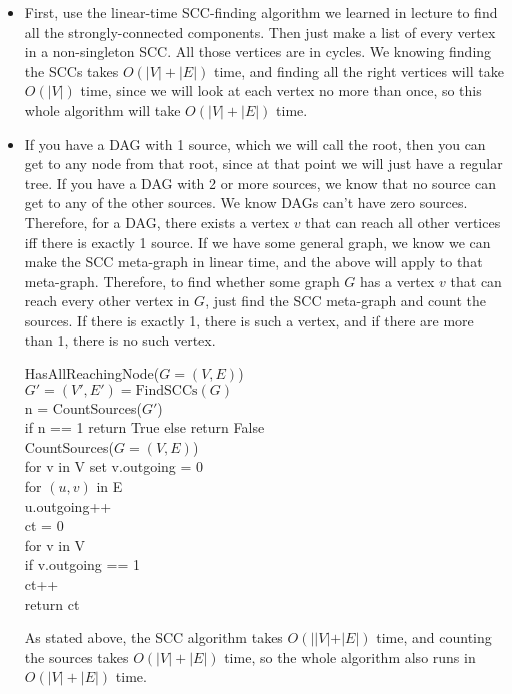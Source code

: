 \documentclass[11pt]{article}
\begin{document}
\begin{solution}
    \begin{itemize}
        \item First, use the linear-time SCC-finding algorithm we learned in lecture to find all the strongly-connected components. Then just make a list of every vertex in a non-singleton SCC. All those vertices are in cycles. We knowing finding the SCCs takes $O(|V| + |E|)$ time, and finding all the right vertices will take $O(|V|)$ time, since we will look at each vertex no more than once, so this whole algorithm will take $O(|V| + |E|)$ time. 
        \item If you have a DAG with 1 source, which we will call the root, then you can get to any node from that root, since at that point we will just have a regular tree. If you have a DAG with 2 or more sources, we know that no source can get to any of the other sources. We know DAGs can't have zero sources. Therefore, for a DAG, there exists a vertex $v$ that can reach all other vertices iff there is exactly 1 source. If we have some general graph, we know we can make the SCC meta-graph in linear time, and the above will apply to that meta-graph. Therefore, to find whether some graph $G$ has a vertex $v$ that can reach every other vertex in $G$, just find the SCC meta-graph and count the sources. If there is exactly 1, there is such a vertex, and if there are more than 1, there is no such vertex.
            \begin{algo}
                HasAllReachingNode($G = (V, E)$) \+
                \\ $G' = (V', E') = \text{FindSCCs}(G)$
                \\ n = CountSources($G'$)
                \\ if n == 1 return True else return False \-
                \\ CountSources($G = (V, E)$) \+
                \\ for v in V set v.outgoing = 0
                \\ for $(u, v)$ in E \+
                \\ u.outgoing++ \-
                \\ ct = 0
                \\ for v in V \+
                \\ if v.outgoing == 1 \+
                \\ ct++ \- \-
                \\ return ct \-
            \end{algo}
            As stated above, the SCC algorithm takes $O(||V| + |E|)$ time, and counting the sources takes $O(|V|+|E|)$ time, so the whole algorithm also runs in $O(|V|+|E|)$ time.
    \end{itemize}
\end{solution}
\end{document}
